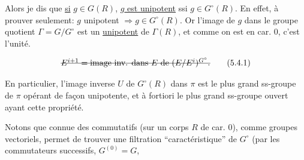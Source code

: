 Alors je dis que  \uline{si} $g\in G(R)$, \uline{$g$ est unipotent} ssi $g\in G^\circ(R)$. En effet,  à prouver  seulement: $g$ unipotent $\Rightarrow g\in G^\circ(R)$. Or  l'image de $g$ dans le groupe quotient $\Gamma=G/G^\circ$ est un  \uline{unipotent} de $\Gamma(R)$, et comme on est en car. $0$, c'est l'unité.

\[
\deleted{E^{i+1}=\text{image inv. dans }E\text{ de }(E/E^i)^{G^\circ}.}
\tag*{(5.4.1)}
\]

En particulier, l'image inverse $U$ de $G^\circ(R)$ dans $\pi$ est le plus grand ss-groupe de $\pi$ opérant de façon unipotente, et à fortiori le plus grand ss-groupe ouvert ayant cette propriété.

 Notons que  connue des   commutatifs (sur un corps $R$ de car. $0$), comme groupes vectoriels, permet de  trouver une filtration ``caractéristique'' de $G^\circ$ (par les  commutateurs successifs, $G^{(0)}=G$,

